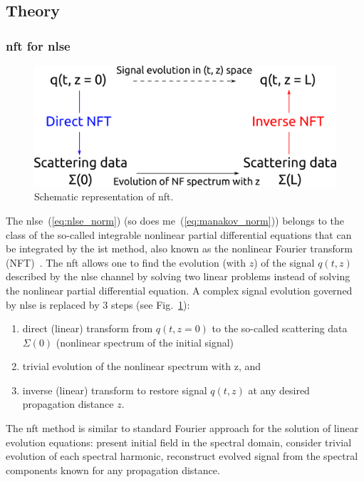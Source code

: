 \subsection{Theory}

\subsubsection{\acrshort{nft} for \acrlong{nlse}}

\begin{figure}[tbp]
	\centering
	\includegraphics[width=0.7\linewidth]{images/theory/nft_scheme.pdf}
	\caption{Schematic representation of \acrlong{nft}.}
	\label{fig:IST}
\end{figure}


The \acrlong{nlse}~(\ref{eq:nlse_norm}) (so does \acrlong{me}~(\ref{eq:manakov_norm})) belongs to the class of the so-called integrable nonlinear partial differential equations that can be integrated by the \Gls{ist} method, also known as the nonlinear Fourier transform (NFT)~\cite{ZakharovShabat1972, Ablowitz1981}.
The \gls{nft} allows one to find the evolution (with $z$) of the signal $q(t,z)$ described by the \acrshort{nlse} channel by solving two linear problems instead of solving the nonlinear partial differential equation. A complex signal evolution governed by \acrshort{nlse} is replaced by 3 steps (see Fig.~\ref{fig:IST}):
\begin{enumerate}
    \item direct (linear) transform from $q(t,z=0)$ to the so-called scattering data $\Sigma(0)$ (nonlinear spectrum of the initial signal)
    \item trivial evolution of the nonlinear spectrum with z, and
    \item inverse (linear) transform to restore signal $q(t,z)$ at any desired propagation distance $z$.
\end{enumerate}
The \acrshort{nft} method is similar to standard Fourier approach for the solution of linear evolution equations: present initial field in the spectral domain, consider trivial evolution of each spectral harmonic, reconstruct evolved signal from the spectral components known for any propagation distance.


